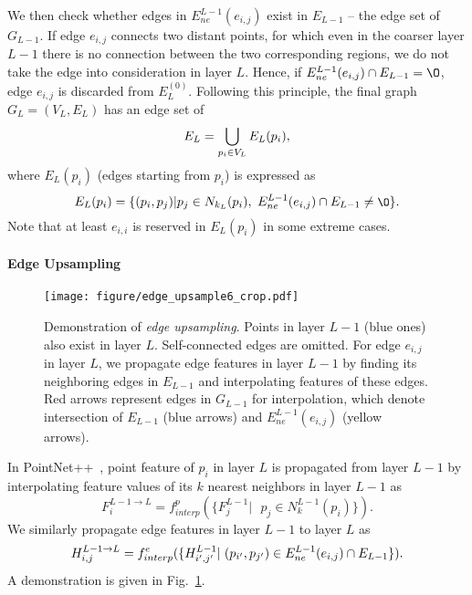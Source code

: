 \documentclass[10pt,twocolumn,letterpaper]{article}
\begin{document}
We then check whether edges in $E_{ne}^{L-1}(e_{i, j}) $ exist in $E_{L-1}$ -- the edge set of $G_{L-1}$. If edge $e_{i, j}$ connects two distant points, for which even in the coarser layer $L-1$ there is no connection between the two corresponding regions, we do not take the edge into consideration in layer $L$. Hence, if $E_{ne}^{L-1}(e_{i, j})  \cap E_{L-1} = \O$,  edge $e_{i, j}$ is discarded from $E_L^{(0)}$. Following this principle, the final graph $G_L = (V_L, E_L)$ has an edge set of
\begin{equation} \small
E_L = \bigcup_{p_i \in V_L} E_L(p_i), \nonumber 
\end{equation}
where $E_L(p_i)$ (edges starting from $p_i$) is expressed as
\begin{equation} \small
E_L(p_i) = \{  (p_i, p_j) | p_j \in N_{k_L}(p_i), \text{ }E_{ne}^{L-1}(e_{i, j})  \cap E_{L-1} \neq \O\}.\nonumber 
\end{equation}
Note that at least $e_{i, i}$ is reserved in $E_L(p_i)$ in some extreme cases.

\vspace{-0.12in}
\paragraph{Edge Upsampling}

\begin{figure}
	\begin{center}
		\texttt{[image: figure/edge\_upsample6\_crop.pdf]}
	\end{center}
	\caption{Demonstration of \textit{edge upsampling}. Points in layer $L-1$ (blue ones) also exist in layer $L$. Self-connected edges are omitted. For edge $e_{i, j}$ in layer $L$, we propagate edge features in layer $L-1$ by finding its neighboring edges in $E_{L-1}$ and interpolating features of these edges. Red arrows represent edges in $G_{L-1}$ for interpolation, which denote intersection of $E_{L-1}$ (blue arrows) and $E_{ne}^{L-1}(e_{i, j})$ (yellow arrows). } 
	\vspace{-3mm}
	\label{fig_edge_upsample}
\end{figure}

In PointNet++~\cite{pointnet2}, point feature of $p_i$ in layer $L$ is propagated from layer $L-1$ by interpolating feature values of its $k$ nearest neighbors in layer $L-1$ as
\begin{equation}
F_i^{L-1 \to L} = f_{interp}^p(\{F_j^{L-1} | \text{ }p_j \in N_k^{L-1}(p_i) \}).
\end{equation}
We similarly propagate edge features in layer $L-1$ to layer $L$ as
\begin{equation}\small
H_{i, j}^{L-1\to L} = f_{interp}^e(\{ H_{i', j'}^{L-1} | \text{ }(p_{i'}, p_{j'}) \in E_{ne}^{L-1}(e_{i, j}) \cap E_{L-1}\}).\nonumber
\end{equation}
A demonstration is given in Fig.~\ref{fig_edge_upsample}.
\end{document}
